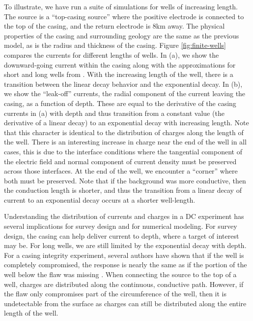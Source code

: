 \documentclass[
    paper
]{geophysics}
\begin{document}
To illustrate, we have run a suite of simulations for wells of increasing length. The source is a ``top-casing source'' where the positive electrode is connected to the top of the casing, and the return electrode is 8km away. The physical properties of the casing and surrounding geology are the same as the previous model, as is the radius and thickness of the casing. Figure \ref{fig:finite-wells} compares the currents for different lengths of wells. In (a), we show the downward-going current within the casing along with the approximations for short and long wells from \cite{Kaufman1993}. With the increasing length of the well, there is a transition between the linear decay behavior and the exponential decay. In (b), we show the ``leak-off'' currents, the radial component of the current leaving the casing, as a function of depth. These are equal to the derivative of the casing currents in (a) with depth and thus transition from a constant value (the derivative of a linear decay) to an exponential decay with increasing length. Note that this character is identical to the distribution of charges along the length of the well. There is an interesting increase in charge near the end of the well in all cases, this is due to the interface conditions where the tangential component of the electric field and normal component of current density must be preserved across those interfaces. At the end of the well, we encounter a ``corner'' where both must be preserved. Note that if the background was more conductive, then the conduction length is shorter, and thus the transition from a linear decay of current to an exponential decay occurs at a shorter well-length.




Understanding the distribution of currents and charges in a DC experiment has several implications for survey design and for numerical modeling. For survey design, the casing can help deliver current to depth, where a target of interest may be. For long wells, we are still limited by the exponential decay with depth. For a casing integrity experiment, several authors have shown that if the well is completely compromised, the response is nearly the same as if the portion of the well below the flaw was missing \citep{Heagy2019, Wilt2020}. When connecting the source to the top of a well, charges are distributed along the continuous, conductive path. However, if the flaw only compromises part of the circumference of the well, then it is undetectable from the surface as charges can still be distributed along the entire length of the well.
\end{document}
